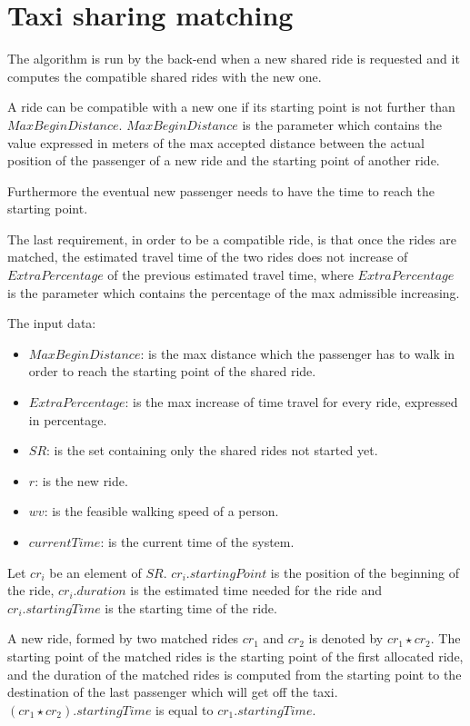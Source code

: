 \section{Taxi sharing matching}
\label{sec:taxi-sharing-matching}
The algorithm is run by the back-end when a new shared ride is requested and it computes the compatible shared rides with the new one.

A ride can be compatible with a new one if its starting point is not further than $MaxBeginDistance$. $MaxBeginDistance$ is the parameter which contains the value expressed in meters of the max accepted distance between the actual position of the passenger of a new ride and the starting point of another ride.

Furthermore the eventual new passenger needs to have the time to reach the starting point.

The last requirement, in order to be a compatible ride, is that once the rides are matched, the estimated travel time of the two rides does not increase of $ExtraPercentage$ of the previous estimated travel time, where $ExtraPercentage$ is the parameter which contains the percentage of the max admissible increasing.

The input data:
\begin{itemize}
	\item $MaxBeginDistance$: is the max distance which the passenger has to walk in order to reach the starting point of the shared ride.
	\item $ExtraPercentage$: is the max increase of time travel for every ride, expressed in percentage.
	\item $SR$: is the set containing only the shared rides not started yet.
	\item $r$: is the new ride.
	\item $wv$: is the feasible walking speed of a person.
	\item $currentTime$: is the current time of the system.
\end{itemize}

Let $cr_i$ be an element of $SR$. $cr_i.startingPoint$ is the position of the beginning of the ride, $cr_i.duration$ is the estimated time needed for the ride and $cr_i.startingTime$ is the starting time of the ride.

A new ride, formed by two matched rides $cr_1$ and $cr_2$ is denoted by $ cr_1 \star cr_2 $. The starting point of the matched rides is the starting point of the first allocated ride, and the duration of the matched rides is computed from the starting point to the destination of the last passenger which will get off the taxi. $ (cr_1 \star cr_2).startingTime $ is equal to $cr_1.startingTime$.

